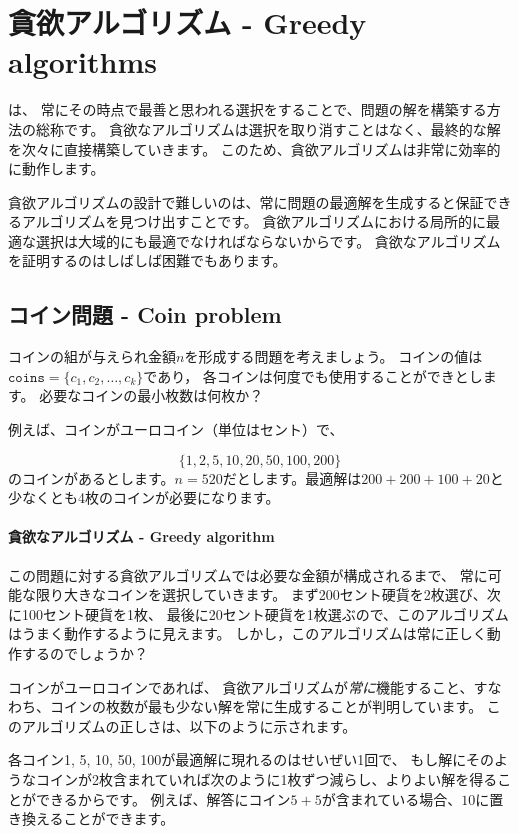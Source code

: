\chapter{貪欲アルゴリズム - Greedy algorithms}


は、
常にその時点で最善と思われる選択をすることで、問題の解を構築する方法の総称です。
貪欲なアルゴリズムは選択を取り消すことはなく、最終的な解を次々に直接構築していきます。
このため、貪欲アルゴリズムは非常に効率的に動作します。

貪欲アルゴリズムの設計で難しいのは、常に問題の最適解を生成すると保証できるアルゴリズムを見つけ出すことです。
貪欲アルゴリズムにおける局所的に最適な選択は大域的にも最適でなければならないからです。
貪欲なアルゴリズムを証明するのはしばしば困難でもあります。

\section{コイン問題 - Coin problem}

コインの組が与えられ金額$n$を形成する問題を考えましょう。
コインの値は$\texttt{coins}=\{c_1,c_2,\ldots,c_k\}$であり，
各コインは何度でも使用することができとします。
必要なコインの最小枚数は何枚か？

例えば、コインがユーロコイン（単位はセント）で、

\[\{1,2,5,10,20,50,100,200\}\]
のコインがあるとします。$n=520$だとします。最適解は$200+200+100+20$と少なくとも4枚のコインが必要になります。

\subsubsection{貪欲なアルゴリズム - Greedy algorithm}

この問題に対する貪欲アルゴリズムでは必要な金額が構成されるまで、
常に可能な限り大きなコインを選択していきます。
まず200セント硬貨を2枚選び、次に100セント硬貨を1枚、
最後に20セント硬貨を1枚選ぶので、このアルゴリズムはうまく動作するように見えます。
しかし，このアルゴリズムは常に正しく動作するのでしょうか？

コインがユーロコインであれば、
貪欲アルゴリズムが\emph{常に}機能すること、すなわち、コインの枚数が最も少ない解を常に生成することが判明しています。
このアルゴリズムの正しさは、以下のように示されます。

各コイン1, 5, 10, 50, 100が最適解に現れるのはせいぜい1回で、
もし解にそのようなコインが2枚含まれていれば次のように1枚ずつ減らし、よりよい解を得ることができるからです。
例えば、解答にコイン$5+5$が含まれている場合、$10$に置き換えることができます。

